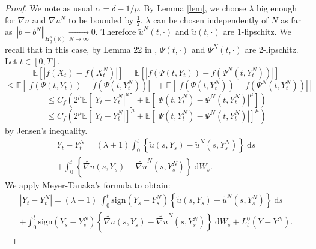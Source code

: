\documentclass[12pt]{article}
\newcommand{\norme}[1]{\left\Vert #1\right\Vert}
\newcommand{\R}{\mathbb{R}}
\newcommand{\E}{\mathbb{E}}
\newcommand{\di}{\mathrm{d}}
\begin{document}
\begin{proof}
    We note as usual $\alpha = \delta - 1/p$.
    By Lemma \ref{lem}, we choose $\lambda$ big enough for $\nabla u$ and $\nabla u^N$ to be bounded by $\frac{1}{2}$. $\lambda$ can be chosen independently of $N$ as far as $\norme{b - b^N}_{H_q^s(\R)} \underset{N\rightarrow\infty}{\longrightarrow} 0$. Therefore $\widetilde{u}^N(t,\cdot)$ and $\widetilde{u}(t,\cdot)$ are $1$-lipschitz. We recall that in this case, by Lemma 22 in \cite{Fla-Iss-Rus-2017}, $\Psi(t,\cdot)$ and $\Psi^N(t,\cdot)$ are 2-lipschitz. Let $t\in[0,T]$.      
    \begin{equation*}
    \E\left[\left|f\left(X_t\right)-f\left(X_t^N\right)\right|\right] = \E\left[\left|f\left(\Psi\left(t,Y_t\right)\right)-f\left(\Psi^N\left(t,Y_t^N\right)\right)\right|\right]
    \end{equation*}   
    \begin{equation*}
    \leq  \E\left[\left|f\left(\Psi\left(t,Y_t\right)\right)-f\left(\Psi\left(t,Y_t^N\right)\right)\right|\right]+\E\left[\left|f\left(\Psi\left(t,Y_t^N\right)\right)-f\left(\Psi^N\left(t,Y_t^N\right)\right)\right|\right]
    \end{equation*}  
    \begin{equation*}
    \leq C_f  \left(2^\mu\E\left[\left|Y_t-Y_t^N\right|^\mu\right]+\E\left[\left|\Psi\left(t,Y_t^N\right)-\Psi^N\left(t,Y_t^N\right)\right|^\mu\right]\right)
    \end{equation*}
    \begin{equation}\label{jensen}
    \leq C_f  \left(2^\mu\E\left[\left|Y_t-Y_t^N\right|\right]^\mu+\E\left[\left|\Psi\left(t,Y_t^N\right)-\Psi^N\left(t,Y_t^N\right)\right|\right]^\mu\right)
    \end{equation}    
    by Jensen's inequality. 
    \begin{multline*}
    Y_t-Y_t^N = (\lambda + 1 )\int_0^t\left\{\widetilde{u}\left(s,Y_s\right)-\widetilde{u}^N\left(s,Y_s^N\right)\right\}\ \di s\\ + \int_0^t\left\{\widetilde{\nabla u}\left(s,Y_s\right)-\widetilde{\nabla u}^N\left(s,Y_s^N\right)\right\}\ \di W_s.
    \end{multline*}
    We apply Meyer-Tanaka's formula to obtain:
    \begin{multline*}
    \left|Y_t-Y_t^N\right| = (\lambda + 1)\ \int_0^t\mathrm{sign}(Y_s-Y_s^N)\left\{\widetilde{u}\left(s,Y_s\right)-\widetilde{u}^N\left(s,Y_s^N\right)\right\}\ \di s\\ + \int_0^t\mathrm{sign}(Y_s-Y_s^N)\left\{\widetilde{\nabla u}\left(s,Y_s\right)-\widetilde{\nabla u}^N\left(s,Y_s^N\right)\right\}\ \di W_s + L_t^0(Y-Y^N).

\end{multline*}
\end{proof}
\end{document}
